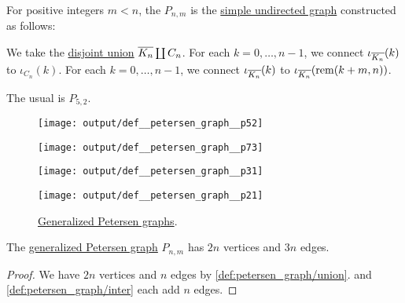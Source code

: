 \begin{definition}\label{def:petersen_graph}
  For positive integers \( m < n \), the  \( P_{n,m} \) is the \hyperref[def:undirected_graph]{simple undirected graph} constructed as follows:
  \begin{thmenum}
     We take the \hyperref[def:graph_disjoint_union]{disjoint union} \( \oline{K_n} \coprod C_n \).
     For each \( k = 0, \ldots, n - 1 \), we connect \( \iota_{\oline{K_n}}(k) \) to \( \iota_{C_n}(k) \).
     For each \( k = 0, \ldots, n - 1 \), we connect \( \iota_{\oline{K_n}}(k) \) to \( \iota_{\oline{K_n}}(\rem(k + m, n)) \).
  \end{thmenum}

  The usual  is \( P_{5,2} \).

  \begin{figure}[!ht]
    \begin{subcaptionblock}{0.45\textwidth}
      \centering
      \texttt{[image: output/def\_\_petersen\_graph\_\_p52]}
      \caption{\( P_{5,2} \)}\label{fig:def:petersen_graph/p52}
    \end{subcaptionblock}
    \hfill
    \begin{subcaptionblock}{0.45\textwidth}
      \centering
      \texttt{[image: output/def\_\_petersen\_graph\_\_p73]}
      \caption{\( P_{7,3} \)}\label{fig:def:petersen_graph/p73}
    \end{subcaptionblock}
    \par
    \begin{subcaptionblock}{0.45\textwidth}
      \centering
      \texttt{[image: output/def\_\_petersen\_graph\_\_p31]}
      \caption{\( P_{3,1} \)}\label{fig:def:petersen_graph/p31}
    \end{subcaptionblock}
    \hfill
    \begin{subcaptionblock}{0.45\textwidth}
      \centering
      \texttt{[image: output/def\_\_petersen\_graph\_\_p21]}
      \caption{\( P_{2,1} \)}\label{fig:def:petersen_graph/p21}
    \end{subcaptionblock}
    \caption{\hyperref[def:petersen_graph]{Generalized Petersen graphs}.}\label{fig:def:petersen_graph}
  \end{figure}
\end{definition}

\begin{proposition}\label{thm:petersen_graph_cardinality}
  The \hyperref[def:petersen_graph]{generalized Petersen graph} \( P_{n,m} \) has \( 2n \) vertices and \( 3n \) edges.
\end{proposition}
\begin{proof}
  We have \( 2n \) vertices and \( n \) edges by \cref{def:petersen_graph/union}.  and \cref{def:petersen_graph/inter} each add \( n \) edges.
\end{proof}

